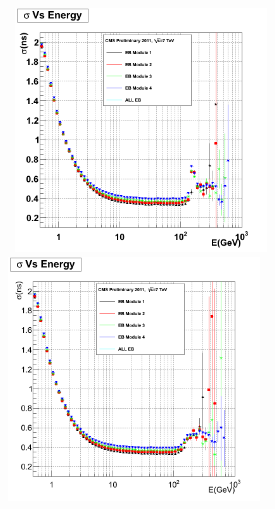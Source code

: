 \vspace{5mm}
\begin{minipage}{0.94\textwidth} 
\begin{center}
\mbox{
\includegraphics[height=0.55\textwidth, width=0.50\textwidth]{THESISPLOTS/EB_SigmaVsEnergy_Stability-CMSSW-44X-GeV.png}
\includegraphics[height=0.55\textwidth, width=0.50\textwidth]{THESISPLOTS/EB_SigmaVsEnergy_Stability-CMSSW53X.png}
}
\label{fig:TimeBiasR}
\end{center}
\end{minipage}

